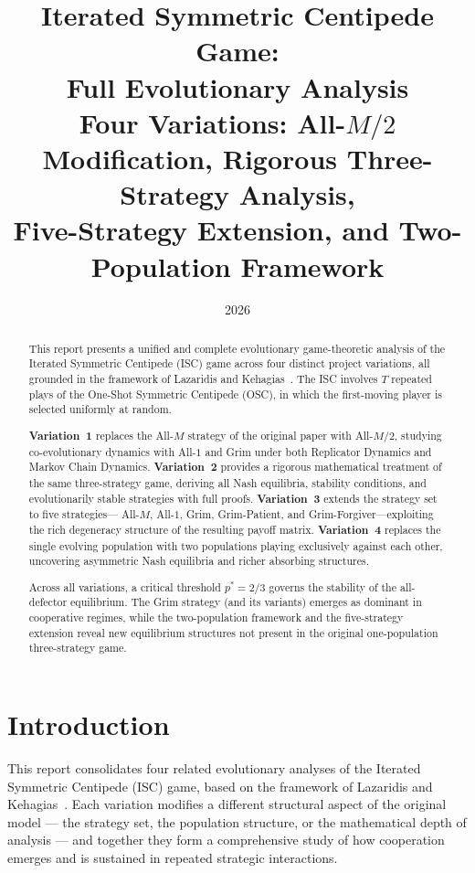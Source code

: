 \documentclass[12pt,a4paper]{article}
\title{\textbf{Iterated Symmetric Centipede Game:\\
Full Evolutionary Analysis}\\[0.5em]
\large Four Variations: All-$M/2$ Modification, Rigorous Three-Strategy Analysis,\\
Five-Strategy Extension, and Two-Population Framework}
\author{}
\date{2026}
\begin{document}
\maketitle

\begin{abstract}
This report presents a unified and complete evolutionary game-theoretic analysis
of the Iterated Symmetric Centipede (ISC) game across four distinct project
variations, all grounded in the framework of Lazaridis and Kehagias~\cite{LK2026}.
The ISC involves $T$ repeated plays of the One-Shot Symmetric Centipede (OSC),
in which the first-moving player is selected uniformly at random.

\textbf{Variation~1} replaces the All-$M$ strategy of the original paper with
All-$M/2$, studying co-evolutionary dynamics with All-$1$ and Grim under both
Replicator Dynamics and Markov Chain Dynamics. \textbf{Variation~2} provides a
rigorous mathematical treatment of the same three-strategy game, deriving all
Nash equilibria, stability conditions, and evolutionarily stable strategies with
full proofs. \textbf{Variation~3} extends the strategy set to five strategies---
All-$M$, All-$1$, Grim, Grim-Patient, and Grim-Forgiver---exploiting the rich
degeneracy structure of the resulting payoff matrix. \textbf{Variation~4}
replaces the single evolving population with two populations playing exclusively
against each other, uncovering asymmetric Nash equilibria and richer absorbing
structures.

Across all variations, a critical threshold $p^* = 2/3$ governs the stability
of the all-defector equilibrium. The Grim strategy (and its variants) emerges as
dominant in cooperative regimes, while the two-population framework and the
five-strategy extension reveal new equilibrium structures not present in the
original one-population three-strategy game.
\end{abstract}

\tableofcontents
\newpage

\section{Introduction}
\label{sec:intro}

This report consolidates four related evolutionary analyses of the Iterated
Symmetric Centipede (ISC) game, based on the framework of Lazaridis and
Kehagias~\cite{LK2026}. Each variation modifies a different structural aspect
of the original model --- the strategy set, the population structure, or the
mathematical depth of analysis --- and together they form a comprehensive study
of how cooperation emerges and is sustained in repeated strategic interactions.
\end{document}
